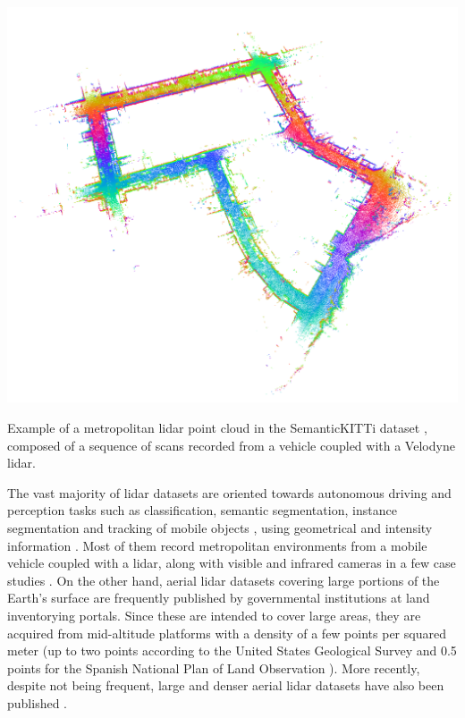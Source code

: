 \begin{marginfigure}[.0cm]
	\includegraphics{figs/context/kitty_scan.png}
	\caption{Example of a metropolitan \acrshort{lidar} point cloud in the SemanticKITTi dataset \cite{behley_towards_2021}, composed of a sequence of scans recorded from a vehicle coupled with a Velodyne \acrshort{lidar}.}
	\label{fig:kitty_scan}
\end{marginfigure}
The vast majority of \acrshort{lidar} datasets are oriented towards autonomous driving and perception tasks such as classification, semantic segmentation, instance segmentation and tracking of mobile objects \cite{chen_automatic_2022}, using geometrical \cite{behley_towards_2021} and intensity information \cite{tan_toronto-3d_2020}. Most of them record metropolitan environments from a mobile vehicle coupled with a \acrshort{lidar}, along with visible and infrared cameras in a few case studies \cite{choi_kaist_2018}. On the other hand, aerial \acrshort{lidar} datasets covering large portions of the Earth's surface are frequently published by governmental institutions at land inventorying portals. Since these are intended to cover large areas, they are acquired from mid-altitude platforms with a density of a few points per squared meter (up to two points according to the United States Geological Survey \cite{us_geological_survey_lidar_2012} and 0.5 points for the Spanish National Plan of Land Observation \cite{instituto_geografico_de_informacion_geografica_pnoa_nodate}). More recently, despite not being frequent, large and denser aerial \acrshort{lidar} datasets have also been published \cite{varney_dales_2020}. 

